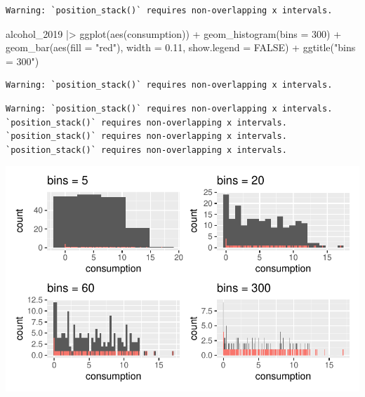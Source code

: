\documentclass[
  letterpaper,
]{krantz}
\makeatletter
\newenvironment{Shaded}{\begin{snugshade}}{\end{snugshade}}
\newcommand{\AttributeTok}[1]{\textcolor[rgb]{0.40,0.45,0.13}{#1}}
\newcommand{\ConstantTok}[1]{\textcolor[rgb]{0.56,0.35,0.01}{#1}}
\newcommand{\DecValTok}[1]{\textcolor[rgb]{0.68,0.00,0.00}{#1}}
\newcommand{\FloatTok}[1]{\textcolor[rgb]{0.68,0.00,0.00}{#1}}
\newcommand{\FunctionTok}[1]{\textcolor[rgb]{0.28,0.35,0.67}{#1}}
\newcommand{\NormalTok}[1]{\textcolor[rgb]{0.00,0.23,0.31}{#1}}
\newcommand{\SpecialCharTok}[1]{\textcolor[rgb]{0.37,0.37,0.37}{#1}}
\newcommand{\StringTok}[1]{\textcolor[rgb]{0.13,0.47,0.30}{#1}}
\newenvironment{kframe}{%
\medskip{}
\setlength{\fboxsep}{.8em}
 \def\at@end@of@kframe{}%
 \ifinner\ifhmode%
  \def\at@end@of@kframe{\end{minipage}}%
  \begin{minipage}{\columnwidth}%
 \fi\fi%
 \def\FrameCommand##1{\hskip\@totalleftmargin \hskip-\fboxsep
 \colorbox{shadecolor}{##1}\hskip-\fboxsep
     \hskip-\linewidth \hskip-\@totalleftmargin \hskip\columnwidth}%
 \MakeFramed {\advance\hsize-\width
   \@totalleftmargin\z@ \linewidth\hsize
   \@setminipage}}%
 {\par\unskip\endMakeFramed%
 \at@end@of@kframe}
\renewenvironment{Shaded}{\begin{kframe}}{\end{kframe}}
\makeatother
\begin{document}
\begin{verbatim}
Warning: `position_stack()` requires non-overlapping x intervals.
\end{verbatim}

\begin{Shaded}
\begin{Highlighting}[]
\NormalTok{  alcohol\_2019 }\SpecialCharTok{|\textgreater{}}
  \FunctionTok{ggplot}\NormalTok{(}\FunctionTok{aes}\NormalTok{(consumption)) }\SpecialCharTok{+}
  \FunctionTok{geom\_histogram}\NormalTok{(}\AttributeTok{bins =} \DecValTok{300}\NormalTok{) }\SpecialCharTok{+}
  \FunctionTok{geom\_bar}\NormalTok{(}\FunctionTok{aes}\NormalTok{(}\AttributeTok{fill =} \StringTok{"red"}\NormalTok{), }\AttributeTok{width =} \FloatTok{0.11}\NormalTok{, }\AttributeTok{show.legend =} \ConstantTok{FALSE}\NormalTok{) }\SpecialCharTok{+}
  \FunctionTok{ggtitle}\NormalTok{(}\StringTok{"bins = 300"}\NormalTok{)}
\end{Highlighting}
\end{Shaded}

\begin{verbatim}
Warning: `position_stack()` requires non-overlapping x intervals.
\end{verbatim}

\begin{verbatim}
Warning: `position_stack()` requires non-overlapping x intervals.
`position_stack()` requires non-overlapping x intervals.
`position_stack()` requires non-overlapping x intervals.
`position_stack()` requires non-overlapping x intervals.
\end{verbatim}

\includegraphics{08_descriptive_statistics_files/figure-pdf/histograms-bins-output-1.pdf}
\end{document}
